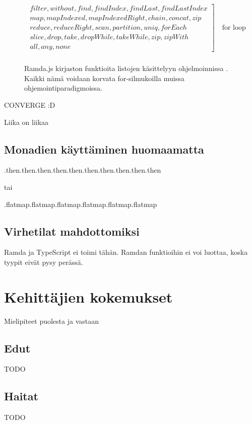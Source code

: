 \begin{figure}[ht]
    \centering
    \[
        \begin{array}{rl}
            \left.
            \begin{array}{l}
                filter, without, find, findIndex, findLast, findLastIndex \\
                map, mapIndexed, mapIndexedRight, chain, concat, zip      \\
                reduce, reduceRight, scan, partition, uniq, forEach       \\
                slice, drop, take, dropWhile, takeWhile, zip, zipWith     \\
                all, any, none
            \end{array}
            \right] \quad \text{for loop}
            \\
        \end{array}
    \]
    \caption{Ramda.js kirjaston funktioita listojen käsittelyyn ohjelmoinnissa \cite{ramda:docs}. Kaikki nämä voidaan korvata for-silmukoilla muissa ohjemointiparadigmoissa.}
    \label{fig:ramdacmds}
\end{figure}


CONVERGE :D

Liika on liikaa

\subsection{Monadien käyttäminen huomaamatta}
.then.then.then.then.then.then.then.then.then.then

tai

.flatmap.flatmap.flatmap.flatmap.flatmap.flatmap

\subsection{Virhetilat mahdottomiksi}

Ramda ja TypeScript ei toimi tähän. Ramdan funktioihin ei voi luottaa, koska tyypit eivät pysy perässä.

\section{Kehittäjien kokemukset}

Mielipiteet puolesta ja vastaan

\subsection{Edut}

TODO

\subsection{Haitat}

TODO
